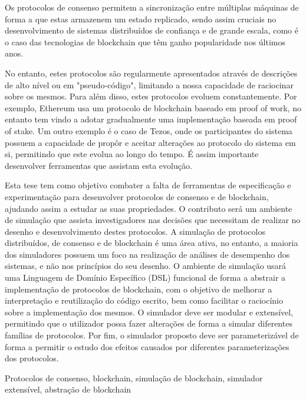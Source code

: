 


Os protocolos de consenso permitem a sincronização entre múltiplas máquinas de forma a que estas armazenem um estado replicado, sendo assim cruciais no desenvolvimento de sistemas distribuídos de confiança e de grande escala, como é o caso das tecnologias de blockchain que têm ganho popularidade nos últimos anos.

No entanto, estes protocolos são regularmente apresentados através de descrições de alto nível ou em "pseudo-código", limitando a nossa capacidade de raciocinar sobre os mesmos. Para além disso, estes protocolos evoluem constantemente. Por exemplo, Ethereum usa um protocolo de blockchain baseado em proof of work, no entanto tem vindo a adotar gradualmente uma implementação baseada em proof of stake. Um outro exemplo é o caso de Tezos, onde os participantes do sistema possuem a capacidade de propôr e aceitar alterações ao protocolo do sistema em si, permitindo que este evolua ao longo do tempo. É assim importante desenvolver ferramentas que assistam esta evolução.

Esta tese tem como objetivo combater a falta de ferramentas de especificação e experimentação para desenvolver protocolos de consenso e de blockchain, ajudando assim a estudar as suas propriedades. O contributo será um ambiente de simulação que assista investigadores nas decisões que necessitam de realizar no desenho e desenvolvimento destes protocolos. A simulação de protocolos distribuídos, de consenso e de blockchain é uma área ativa, no entanto, a maioria dos simuladores possuem um foco na realização de análises de desempenho dos sistemas, e não nos princípios do seu desenho. O ambiente de simulação usará uma Linguagem de Domínio Específico (DSL) funcional de forma a abstrair a implementação de protocolos de blockchain, com o objetivo de melhorar a interpretação e reutilização do código escrito, bem como facilitar o raciocínio sobre a implementação dos mesmos. O simulador deve ser modular e extensível, permitindo que o utilizador possa fazer alterações de forma a simular diferentes famílias de protocolos. Por fim, o simulador proposto deve ser parameterizável de forma a permitir o estudo dos efeitos causados por diferentes parameterizações dos protocolos.


\begin{keywords}
Protocolos de consenso, blockchain, simulação de blockchain, simulador extensível, abstração de blockchain
\end{keywords}
